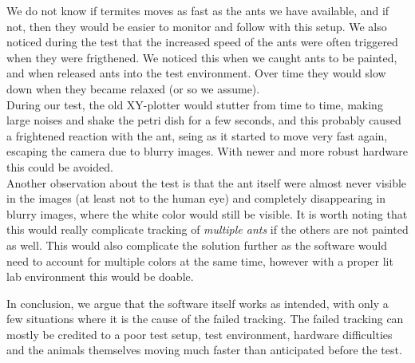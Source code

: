 We do not know if termites moves as fast as the ants we have available, and if not, then they would be easier to monitor and follow with this setup. We also noticed during the test that the increased speed of the ants were often triggered when they were frigthened. We noticed this when we caught ants to be painted, and when released ants into the test environment. Over time they would slow down when they became relaxed (or so we assume). \\

During our test, the old XY-plotter would stutter from time to time, making large noises and shake the petri dish for a few seconds, and this probably caused a frightened reaction with the ant, seing as it started to move very fast again, escaping the camera due to blurry images. With newer and more robust hardware this could be avoided. \\

Another observation about the test is that the ant itself were almost never visible in the images (at least not to the human eye) and completely disappearing in blurry images, where the white color would still be visible. It is worth noting that this would really complicate tracking of \emph{multiple ants} if the others are not painted as well. This would also complicate the solution further as the software would need to account for multiple colors at the same time, however with a proper lit lab environment this would be doable.\\


In conclusion, we argue that the software itself works as intended, with only a few situations where it is the cause of the failed tracking. The failed tracking can mostly be credited to a poor test setup, test environment, hardware difficulties and the animals themselves moving much faster than anticipated before the test.\\
